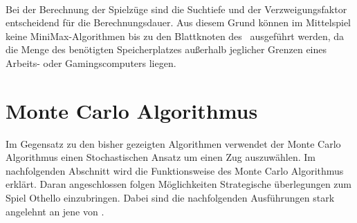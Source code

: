 \\Bei der Berechnung der Spielzüge sind die Suchtiefe und der Verzweigungsfaktor entscheidend für die Berechnungsdauer. Aus diesem Grund können im Mittelspiel keine MiniMax-Algorithmen bis zu den Blattknoten des \gtrees\ ausgeführt werden, da die Menge des benötigten Speicherplatzes außerhalb jeglicher Grenzen eines Arbeits- oder Gamingscomputers liegen.

\section{Monte Carlo Algorithmus}
Im Gegensatz zu den bisher gezeigten Algorithmen verwendet der Monte Carlo Algorithmus einen Stochastischen Ansatz um einen Zug auszuwählen. Im nachfolgenden Abschnitt wird die Funktionsweise des Monte Carlo Algorithmus erklärt. Daran angeschlossen folgen Möglichkeiten Strategische überlegungen zum Spiel Othello einzubringen. Dabei sind die nachfolgenden Ausführungen stark angelehnt an jene von \cite{nijssen_2007}.
